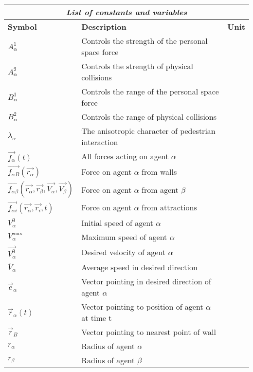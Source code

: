 \begin{center}
\begin{tabular}{lll}
\hline
\multicolumn{3}{|c|}{\emph{List of constants and variables}}\\
\hline
\small{\textbf{Symbol}} & \small{\textbf{Description}} & \small{\textbf{Unit}}\\
\hline
$A_{\alpha}^{1}$ & \small{Controls the strength of the personal space force}\\
\hline
$A_{\alpha}^{2}$ & \small{Controls the strength of physical collisions}  & \\
\hline
$B_{\alpha}^{1}$ & \small{Controls the range of the personal space force} & \\
\hline
$B_{\alpha}^{2}$ & \small{Controls the range of physical collisions} & \\
\hline
$\lambda_{\alpha}$ & The anisotropic character of pedestrian interaction & \\
\hline
$\vec{f_{\alpha}} \left( t \right)$ & All forces acting on agent $\alpha$  & \\
\hline
$\vec{f_{\alpha B}} \left( \vec{r_{\alpha}} \right)$ & Force on agent $\alpha$ from walls & \\
\hline
$\vec{f_{\alpha \beta}} \left( \vec{r_{\alpha}}, \vec{r_{\beta}}, \vec{V_{\alpha}}, \vec{V_{\beta}} \right)$ & Force on agent $\alpha$ from agent $\beta$ & \\
\hline
$\vec{f_{\alpha i}} \left( \vec{r_{\alpha}}, \vec{r_{i}}, t \right)$ & Force on agent $\alpha$ from attractions & \\
\hline
$V_{\alpha}^{0}$ & Initial speed of agent $\alpha$ & \\
\hline
$V_{\alpha}^{\text{max}}$ & Maximum speed of agent $\alpha$ & \\
\hline
$\vec{V_{\alpha}^{\text{0}}}$ & Desired velocity of agent $\alpha$ & \\
\hline
$\overline{V}_{\alpha}$ & Average speed in desired direction & \\
\hline
$\vec{e}_{\alpha}$ & Vector pointing in desired direction of agent $\alpha$ & \\
\hline
$\vec{r}_{\alpha}\left( t \right) $ & Vector pointing to position of agent $\alpha$ at time t & \\
\hline
$\vec{r}_{B}$ & Vector pointing to nearest point of wall & \\
\hline
$r_{\alpha}$ & Radius of agent $\alpha$ & \\
\hline
$r_{\beta}$ & Radius of agent $\beta$ & \\

\end{tabular}
\end{center}
